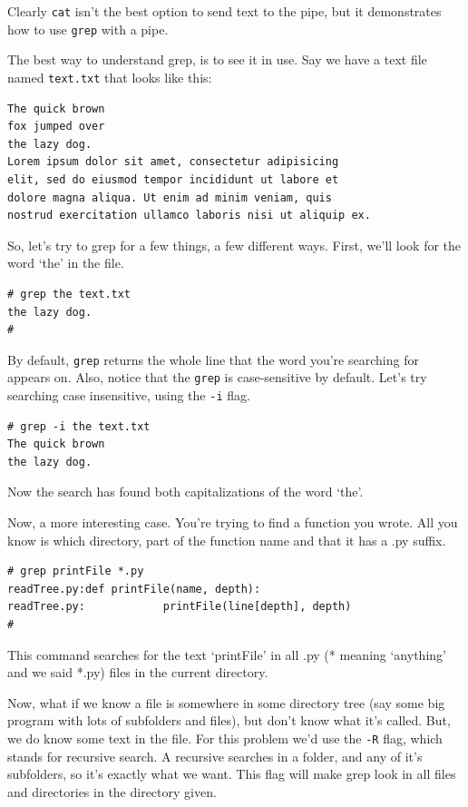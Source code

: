 Clearly {\tt cat} isn't the best option to send text to the pipe,
but it demonstrates how to use {\tt grep} with a pipe.


The best way to understand grep, is to see it in use. Say we have a text file named {\tt text.txt} that looks like this:
{\tt \begin{verbatim}
The quick brown
fox jumped over
the lazy dog.
Lorem ipsum dolor sit amet, consectetur adipisicing 
elit, sed do eiusmod tempor incididunt ut labore et 
dolore magna aliqua. Ut enim ad minim veniam, quis 
nostrud exercitation ullamco laboris nisi ut aliquip ex.
\end{verbatim}
}

So, let's try to grep for a few things, a few different ways. First, 
we'll look for the word `the' in the file.
{\tt \begin{verbatim}
# grep the text.txt 
the lazy dog.
#
\end{verbatim}
}
By default, {\tt grep} returns the whole line that the 
word you're searching for appears on. Also, notice that the {\tt grep} is 
case-sensitive by default. Let's try searching case insensitive, using
the {\tt -i} flag.

{\tt \begin{verbatim}
# grep -i the text.txt 
The quick brown
the lazy dog.
\end{verbatim}
}
Now the search has found both capitalizations of the word `the'.

Now, a more interesting case.  You're trying to find a function
you wrote.  All you know is which directory, part of the 
function name and that it has a .py suffix.

{\tt \begin{verbatim}
# grep printFile *.py
readTree.py:def printFile(name, depth):
readTree.py:            printFile(line[depth], depth)
#
\end{verbatim}
}
This command searches for the text `printFile' in all .py (* meaning `anything' and we said *.py) 
files in the current  directory. 

Now, what if we know a file is somewhere in some directory tree
(say some big program with lots of subfolders and files), but don't
know what it's called.  But, we do know some text in the file.
For this problem we'd use the {\tt -R} flag, which stands for recursive search.
A recursive searches in a folder, and any of it's subfolders, so it's exactly what we want.  
This flag will make grep look in all files and directories in the 
directory given.


